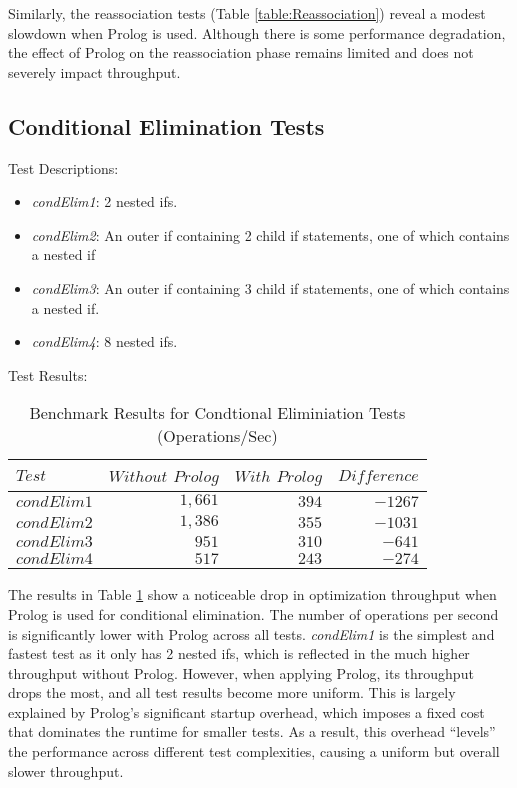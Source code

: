 Similarly, the reassociation tests (Table \ref{table:Reassociation}) reveal a modest slowdown when Prolog is used. Although there is some performance degradation, the effect of Prolog on the reassociation phase remains limited and does not severely impact throughput.

\subsection*{Conditional Elimination Tests}

Test Descriptions:
\begin{itemize}
    \item \textit{condElim1}: 2 nested ifs.
    \item \textit{condElim2}: An outer if containing 2 child if statements, one of which contains a nested if
    \item \textit{condElim3}: An outer if containing 3 child if statements, one of which contains a nested if.
    \item \textit{condElim4}: 8 nested ifs.
\end{itemize}

Test Results:
\begin{table}[h]
    \centering
    \begin{tabular}{|l|r|r|r|}
        \hline
        $Test$ & $Without$ $Prolog$ & $With$ $Prolog$ & $Difference$ \\
        \hline
        $condElim1$ & $1,661$ & $394$ & $-1267$ \\
        $condElim2$ & $1,386$ & $355$ & $-1031$ \\
        $condElim3$ & $951$ & $310$ & $-641$ \\
        $condElim4$ & $517$ & $243$ & $-274$ \\
        \hline
    \end{tabular}
    \caption{Benchmark Results for Condtional Eliminiation Tests (Operations/Sec)}
    \label{table:condElimination}
\end{table} 
\smallbreak

\vspace{-10pt}
The results in Table \ref{table:condElimination} show a noticeable drop in optimization throughput when Prolog is used for conditional elimination. The number of operations per second is significantly lower with Prolog across all tests. \textit{condElim1} is the simplest and fastest test as it only has 2 nested ifs, which is reflected in the much higher throughput without Prolog. However, when applying Prolog, its throughput drops the most, and all test results become more uniform. This is largely explained by Prolog’s significant startup overhead, which imposes a fixed cost that dominates the runtime for smaller tests. As a result, this overhead “levels” the performance across different test complexities, causing a uniform but overall slower throughput.
